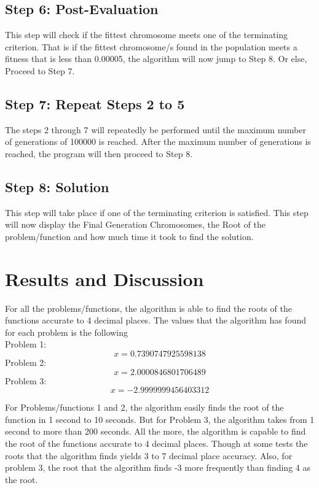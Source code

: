 \documentclass{acm_proc_article-sp}
\begin{document}
\subsection{Step 6: Post-Evaluation}
This step will check if the fittest chromosome meets one of the terminating criterion. That is if the fittest chromosome/s found in the population meets a fitness that is less than 0.00005, the algorithm will now jump to Step 8. Or else, Proceed to Step 7.

\subsection{Step 7: Repeat Steps 2 to 5}
The steps 2 through 7 will repeatedly be performed until the maximum number of generations of 100000 is reached. After the maximum number of generations is reached, the program will then proceed to Step 8.

\subsection{Step 8: Solution}
This step will take place if one of the terminating criterion is satisfied. This step will now display the Final Generation Chromosomes, the Root of the problem/function and how much time it took to find the solution.

\section{Results and Discussion}
For all the problems/functions, the algorithm is able to find the roots of the functions accurate to 4 decimal places. The values that the algorithm has found for each problem is the following\\
Problem 1:
\begin{equation}
x = 0.7390747925598138
\end{equation}
Problem 2:
\begin{equation}
x = 2.0000846801706489
\end{equation}
Problem 3:
\begin{equation}
x = -2.9999999456403312
\end{equation}

For Problems/functions 1 and 2, the algorithm easily finds the root of the function in 1 second to 10 seconds. But for Problem 3, the algorithm takes from 1 second to more than 200 seconds. All the more, the algorithm is capable to find the root of the functions accurate to 4 decimal places. Though at some tests the roots that the algorithm finds yields 3 to 7 decimal place accuracy. Also, for problem 3, the root that the algorithm finds -3 more frequently than finding 4 as the root.
\end{document}
